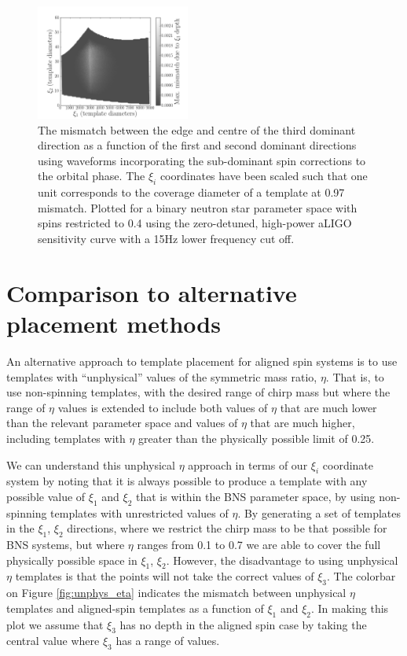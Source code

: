 \begin{figure}
\begin{center}
\includegraphics[width=0.45\textwidth]{papers/bns_spin/figure8.png}
\end{center}
\caption{\label{fig:higher_order_spin} The mismatch between the edge and centre of the
third dominant direction as a function of the first and second dominant
directions using waveforms incorporating the sub-dominant spin corrections to the orbital phase.
The $\xi_i$ coordinates have been scaled
such that one unit corresponds to the coverage diameter of a template
at 0.97 mismatch.
Plotted for a binary neutron star parameter space with spins restricted
to 0.4
using the zero-detuned, high-power aLIGO sensitivity curve with a 15Hz lower frequency cut off.}
\end{figure}

\section{Comparison to alternative placement methods}

An alternative approach to template placement for aligned spin systems is to use templates
with ``unphysical'' values of the symmetric mass ratio, $\eta$.
That is, to use non-spinning templates, with the desired range of chirp
mass but where the range of $\eta$ values is extended to include both values of $\eta$ that are much lower than
the relevant parameter space and values of $\eta$ that are much higher,
including templates with $\eta$ greater than the physically possible limit of 0.25.

We can understand this unphysical $\eta$ approach in terms of our $\xi_i$ coordinate system by noting that
it is always possible to produce a template with any possible value
of $\xi_1$ and $\xi_2$ that is within the BNS parameter space, by using non-spinning templates
with unrestricted values of $\eta$.
By generating a set of templates in the $\xi_1$, $\xi_2$ directions,
where we restrict the chirp mass to be that possible for BNS systems, but where $\eta$
ranges from 0.1 to 0.7 we are able to cover the full physically possible space in $\xi_1$, $\xi_2$. However,
the disadvantage to using unphysical $\eta$ templates is that the points will not take the correct values
of $\xi_3$. The colorbar on Figure \ref{fig:unphys_eta} indicates the mismatch between unphysical $\eta$ templates and
aligned-spin templates as a function of $\xi_1$ and $\xi_2$. In making this plot we assume that $\xi_3$
has no depth in the aligned spin case by taking the central value where $\xi_3$ has a range of values.

